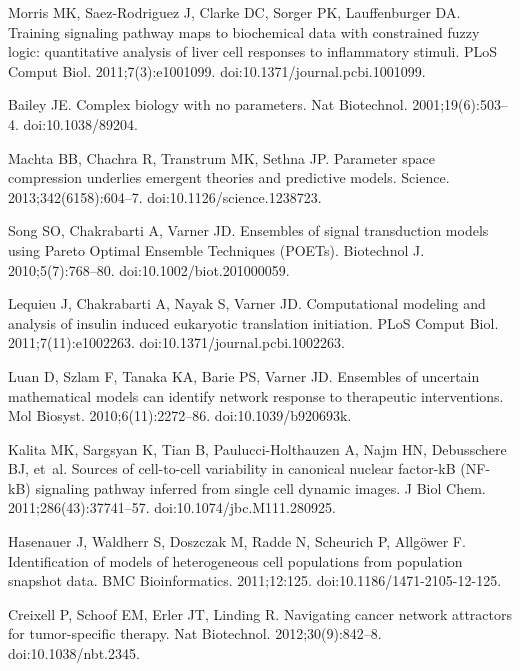 \documentclass[11pt,letterpaper]{article}
\begin{document}
\begin{thebibliography}{10}
Morris MK, Saez-Rodriguez J, Clarke DC, Sorger PK, Lauffenburger DA.
\newblock Training signaling pathway maps to biochemical data with constrained
  fuzzy logic: quantitative analysis of liver cell responses to inflammatory
  stimuli.
\newblock PLoS Comput Biol. 2011;7(3):e1001099.
\newblock doi:{10.1371/journal.pcbi.1001099}.

Bailey JE.
\newblock Complex biology with no parameters.
\newblock Nat Biotechnol. 2001;19(6):503--4.
\newblock doi:{10.1038/89204}.

Machta BB, Chachra R, Transtrum MK, Sethna JP.
\newblock Parameter space compression underlies emergent theories and
  predictive models.
\newblock Science. 2013;342(6158):604--7.
\newblock doi:{10.1126/science.1238723}.

Song SO, Chakrabarti A, Varner JD.
\newblock Ensembles of signal transduction models using Pareto Optimal Ensemble
  Techniques (POETs).
\newblock Biotechnol J. 2010;5(7):768--80.
\newblock doi:{10.1002/biot.201000059}.

Lequieu J, Chakrabarti A, Nayak S, Varner JD.
\newblock Computational modeling and analysis of insulin induced eukaryotic
  translation initiation.
\newblock PLoS Comput Biol. 2011;7(11):e1002263.
\newblock doi:{10.1371/journal.pcbi.1002263}.

Luan D, Szlam F, Tanaka KA, Barie PS, Varner JD.
\newblock Ensembles of uncertain mathematical models can identify network
  response to therapeutic interventions.
\newblock Mol Biosyst. 2010;6(11):2272--86.
\newblock doi:{10.1039/b920693k}.

Kalita MK, Sargsyan K, Tian B, Paulucci-Holthauzen A, Najm HN, Debusschere BJ,
  et~al.
\newblock Sources of cell-to-cell variability in canonical nuclear factor-kB
  (NF-kB) signaling pathway inferred from single cell dynamic images.
\newblock J Biol Chem. 2011;286(43):37741--57.
\newblock doi:{10.1074/jbc.M111.280925}.

Hasenauer J, Waldherr S, Doszczak M, Radde N, Scheurich P, Allg{\"o}wer F.
\newblock Identification of models of heterogeneous cell populations from
  population snapshot data.
\newblock BMC Bioinformatics. 2011;12:125.
\newblock doi:{10.1186/1471-2105-12-125}.

Creixell P, Schoof EM, Erler JT, Linding R.
\newblock Navigating cancer network attractors for tumor-specific therapy.
\newblock Nat Biotechnol. 2012;30(9):842--8.
\newblock doi:{10.1038/nbt.2345}.


\end{thebibliography}
\end{document}
